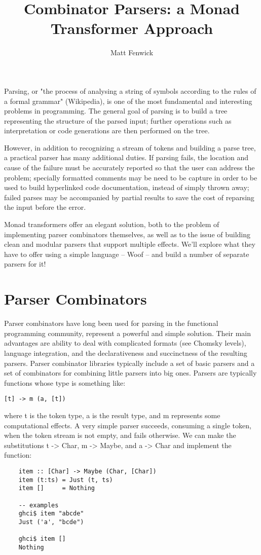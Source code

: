 \documentclass{tmr}
\title{Combinator Parsers:  a Monad Transformer Approach}
\author{Matt Fenwick\email{mfenwick100@gmail.com}}
\begin{document}
\begin{introduction}
Parsing, or "the process of analysing a 
string of symbols according to the rules of a formal grammar" (Wikipedia),
is one of the most fundamental and interesting problems in programming.
The general goal of parsing is to build a tree representing the structure
of the parsed input; further operations such as interpretation or
code generations are then performed on the tree.

However, in addition to recognizing a stream of tokens and building a parse
tree, a practical parser has many additional duties.  If parsing fails,
the location and cause of the failure must be accurately reported so that
the user can address the problem; specially formatted comments may be need
to be capture in order to be used
to build hyperlinked code documentation, instead of simply thrown away; 
failed parses may be accompanied by partial results to save the cost
of reparsing the input before the error.

Monad transformers offer an elegant solution, both to the problem of 
implementing parser combinators themselves, as well as to the issue of
building clean and modular parsers that support multiple effects.
We'll explore what they have to offer using a simple language -- Woof --
and build a number of separate parsers for it!
\end{introduction}


\section{Parser Combinators}
Parser combinators have long been used for parsing in the 
functional programming community, represent a powerful and simple solution.
Their main advantages are ability to deal with complicated formats (see
Chomsky levels), language integration, and the declarativeness and
succinctness of the resulting parsers.
Parser combinator libraries typically include a set of basic parsers and a
set of combinators for combining little parsers into big ones.  Parsers are
typically functions whose type is something like:
\begin{verbatim}
[t] -> m (a, [t])
\end{verbatim}
where t is the token type, a is the result type, and m represents some
computational effects.
A very simple parser succeeds, consuming a single token, when the token stream
is not empty, and fails otherwise.  We can make the substitutions t -> Char,
m -> Maybe, and a -> Char and implement the function:
\begin{verbatim}
    item :: [Char] -> Maybe (Char, [Char])
    item (t:ts) = Just (t, ts)
    item []     = Nothing
    
    -- examples
    ghci$ item "abcde"
    Just ('a', "bcde")
    
    ghci$ item []
    Nothing
\end{verbatim}
\end{document}
